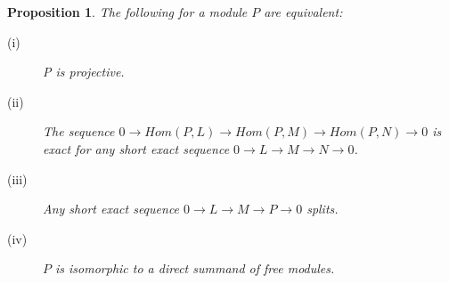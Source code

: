 \documentclass[11.5pt, twoside, a4paper, titlepage]{report}
\theoremstyle{definition}
\theoremstyle{plain}
\newtheorem{prop}[mydef]{Proposition}
\begin{document}
\begin{prop} \label{projectiveprop}
The following for a module $P$ are equivalent:
\begin{description}
\item [(i)] P is projective.
\item [(ii)] The sequence $0\xrightarrow{}Hom(P, L)\xrightarrow{}Hom(P, M)\xrightarrow{}Hom(P, N)\xrightarrow{}0$ is exact for any short exact sequence $0\xrightarrow{}L\xrightarrow{}M\xrightarrow{}N\xrightarrow{}0$.
\item [(iii)]Any short exact sequence $0\xrightarrow{}L\xrightarrow{}M\xrightarrow{}P\xrightarrow{}0$ splits.
\item [(iv)]$P$ is isomorphic to a direct summand of free modules.
\end{description}
\end{prop}
\end{document}
